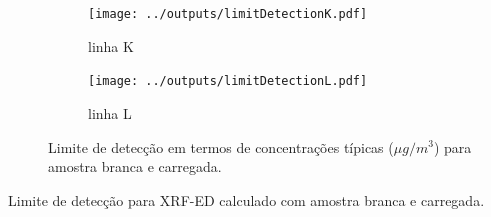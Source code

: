 \begin{figure}[H]
  \begin{subfigure}[b]{0.5\textwidth}
    \texttt{[image: ../outputs/limitDetectionK.pdf]}
    \caption{linha K}
  \end{subfigure}%
  \begin{subfigure}[b]{0.5\textwidth}
    \texttt{[image: ../outputs/limitDetectionL.pdf]}
    \caption{linha L}
  \end{subfigure}
  \caption{Limite de detecção em termos de concentrações típicas 
           ($\mu g / m^3$) para amostra branca e carregada.
           \label{table:ld}}
\end{figure}

\begin{table}[H]
  \centering
  
  \caption{Limite de detecção para XRF-ED calculado com amostra branca e
           carregada. \label{table:LD}}
\end{table}
